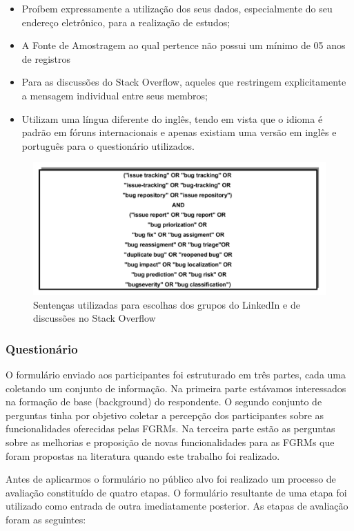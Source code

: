 \begin{itemize}
	\item Proíbem expressamente a utilização dos seus dados, especialmente do
		seu endereço eletrônico, para a realização de estudos;
	\item A Fonte de Amostragem ao qual pertence não possui um mínimo de 05 anos
		de registros
	\item Para as discussões do Stack Overflow, aqueles que restringem
		explicitamente a mensagem individual entre seus membros;
    \item Utilizam uma língua diferente do inglês, tendo em vista que o idioma
		 é padrão em fóruns internacionais e apenas existiam uma versão em
		inglês e português para o questionário utilizados.
\end{itemize}

\begin{figure}[htpb]
	\centering
	\includegraphics[width=0.8\linewidth]{./chapter-pesquisa-com-profissionais/img/setencas-grupos.pdf}
	\caption{Sentenças utilizadas para escolhas dos grupos do LinkedIn e de
		discussões no Stack Overflow}
\label{fig:setencas-grupos}
\end{figure}

\subsubsection{Questionário}
\label{subsubsec:questionario}

O formulário enviado aos participantes foi estruturado em três partes, cada uma
coletando um conjunto de informação. Na primeira parte estávamos interessados na
formação de base (background) do respondente. O segundo conjunto de perguntas
tinha por objetivo  coletar a percepção dos participantes sobre as
funcionalidades oferecidas pelas FGRMs\@. Na terceira parte estão as perguntas
sobre as melhorias e proposição de novas funcionalidades para as FGRMs que foram
propostas na literatura quando este trabalho foi realizado.

Antes de aplicarmos o formulário no público alvo foi realizado um processo de
avaliação constituído de quatro etapas. O formulário resultante de uma etapa foi
utilizado como entrada de outra imediatamente posterior. As etapas de avaliação
foram as seguintes:

